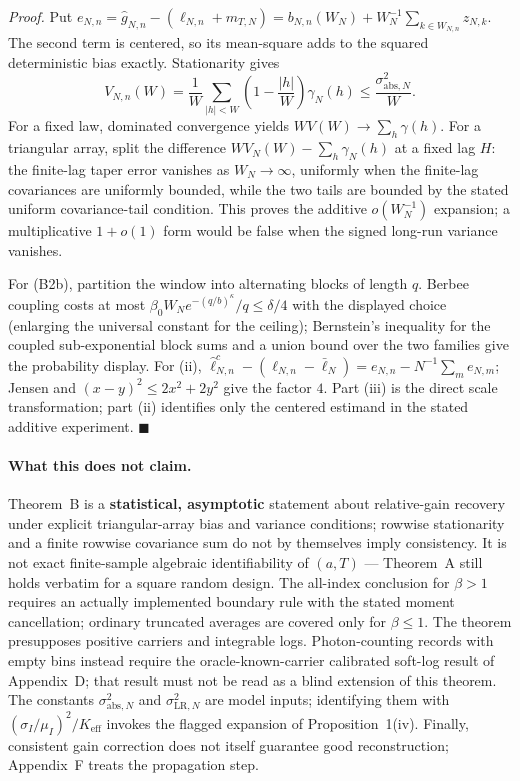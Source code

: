 \noindent\emph{Proof.} Put $e_{N,n}=\hat g_{N,n}-(\ell_{N,n}+m_{T,N})=b_{N,n}(W_N)+W_N^{-1}\sum_{k\in W_{N,n}}z_{N,k}$. The second term is centered, so its mean-square adds to the squared deterministic bias exactly. Stationarity gives
\[
V_{N,n}(W)=\frac1W\sum_{|h|<W}\left(1-\frac{|h|}{W}\right)\gamma_N(h)
\le\frac{\sigma_{\mathrm{abs},N}^2}{W}.
\]
For a fixed law, dominated convergence yields $WV(W)\to\sum_h\gamma(h)$. For a triangular array, split the difference $WV_N(W)-\sum_h\gamma_N(h)$ at a fixed lag $H$: the finite-lag taper error vanishes as $W_N\to\infty$, uniformly when the finite-lag covariances are uniformly bounded, while the two tails are bounded by the stated uniform covariance-tail condition. This proves the additive $o(W_N^{-1})$ expansion; a multiplicative $1+o(1)$ form would be false when the signed long-run variance vanishes.

For (B2b), partition the window into alternating blocks of length $q$. Berbee coupling costs at most $\beta_0W_Ne^{-(q/b)^\kappa}/q\le\delta/4$ with the displayed choice (enlarging the universal constant for the ceiling); Bernstein's inequality for the coupled sub-exponential block sums and a union bound over the two families give the probability display. For (ii), $\hat\ell_{N,n}^{c}-(\ell_{N,n}-\bar\ell_N)=e_{N,n}-N^{-1}\sum_me_{N,m}$; Jensen and $(x-y)^2\le2x^2+2y^2$ give the factor $4$. Part (iii) is the direct scale transformation; part (ii) identifies only the centered estimand in the stated additive experiment. \hfill$\blacksquare$

\paragraph{What this does not claim.} Theorem~B is a \textbf{statistical, asymptotic} statement about relative-gain recovery under explicit triangular-array bias and variance conditions; rowwise stationarity and a finite rowwise covariance sum do not by themselves imply consistency. It is not exact finite-sample algebraic identifiability of $(a,T)$ --- Theorem~A still holds verbatim for a square random design. The all-index conclusion for $\beta>1$ requires an actually implemented boundary rule with the stated moment cancellation; ordinary truncated averages are covered only for $\beta\le1$. The theorem presupposes positive carriers and integrable logs. Photon-counting records with empty bins instead require the oracle-known-carrier calibrated soft-log result of Appendix~D; that result must not be read as a blind extension of this theorem. The constants $\sigma_{\mathrm{abs},N}^2$ and $\sigma_{\mathrm{LR},N}^2$ are model inputs; identifying them with $(\sigma_I/\mu_I)^2/K_{\mathrm{eff}}$ invokes the flagged expansion of Proposition~1(iv). Finally, consistent gain correction does not itself guarantee good reconstruction; Appendix~F treats the propagation step.

